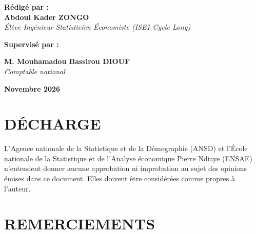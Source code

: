 \documentclass[12pt,a4paper]{report}
\begin{document}
\begin{titlepage}
\vspace{0.45cm}
{\large\color{navyblue}\bfseries Rédigé par :}\\
 {\large\textbf{Abdoul Kader ZONGO}}\\
{\large\textit{\color{navyblue}Élève Ingénieur Statisticien Économiste (ISE1 Cycle Long)}}

\vspace{0.45cm}
{\large\color{navyblue}\bfseries Supervisé par :}\\
\begin{minipage}{0.7\textwidth}
\centering
{\large\textbf{M. Mouhamadou Bassirou DIOUF}}\\
{\large\textit{\color{navyblue}Comptable national}}
\end{minipage}

\vspace{0.55cm}
\begin{tcolorbox}[colback=navyblue!6,colframe=navyblue,arc=0pt,width=4.8cm,halign=center]
{\large\textbf{Novembre 2026}}
\end{tcolorbox}
\end{titlepage}
\hypersetup{pageanchor=true}


\chapter*{DÉCHARGE}
\begin{tcolorbox}[
  enhanced,
  colback=white,
  colframe=navyblue,
  boxrule=1pt,
  arc=3mm,
  left=12pt,
  right=12pt,
  top=12pt,
  bottom=12pt,
  interior style={top color=white,bottom color=navyblue!8},
  fuzzy shadow={1.5mm}{-1.5mm}{0mm}{0.3mm}{navyblue!30}
]
\begin{justify}
L’Agence nationale de la Statistique et de la Démographie (ANSD) et l’École nationale de la Statistique et de l’Analyse économique Pierre Ndiaye (ENSAE) n’entendent donner aucune approbation ni improbation au sujet des opinions émises dans ce document. Elles doivent être considérées comme propres à l’auteur.
\end{justify}
\end{tcolorbox}

\chapter*{REMERCIEMENTS}
\end{document}
